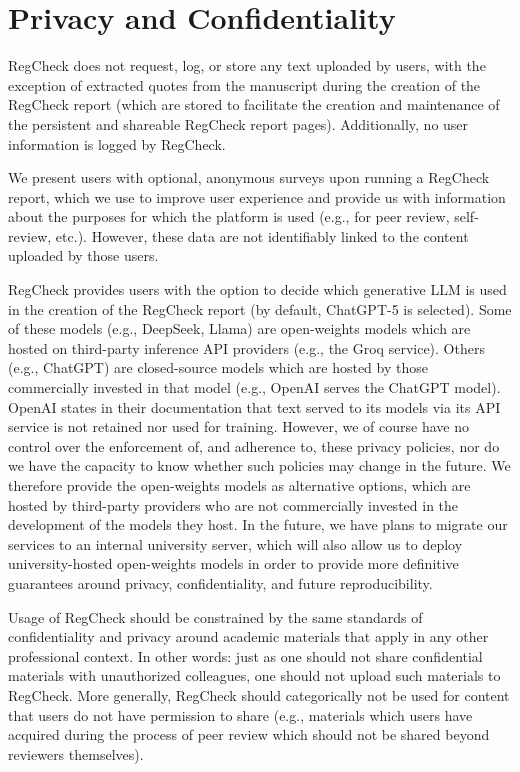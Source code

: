 \documentclass{article}
\begin{document}
\section{Privacy and Confidentiality}
RegCheck does not request, log, or store any text uploaded by users, with the exception of extracted quotes from the manuscript during the creation of the RegCheck report (which are stored to facilitate the creation and maintenance of the persistent and shareable RegCheck report pages). Additionally, no user information is logged by RegCheck.

We present users with optional, anonymous surveys upon running a RegCheck report, which we use to improve user experience and provide us with information about the purposes for which the platform is used (e.g., for peer review, self-review, etc.). However, these data are not identifiably linked to the content uploaded by those users.

RegCheck provides users with the option to decide which generative LLM is used in the creation of the RegCheck report (by default, ChatGPT-5 is selected). Some of these models (e.g., DeepSeek, Llama) are open-weights models which are hosted on third-party inference API providers (e.g., the Groq service). Others (e.g., ChatGPT) are closed-source models which are hosted by those commercially invested in that model (e.g., OpenAI serves the ChatGPT model). OpenAI states in their documentation that text served to its models via its API service is not retained nor used for training. However, we of course have no control over the enforcement of, and adherence to, these privacy policies, nor do we have the capacity to know whether such policies may change in the future. We therefore provide the open-weights models as alternative options, which are hosted by third-party providers who are not commercially invested in the development of the models they host. In the future, we have plans to migrate our services to an internal university server, which will also allow us to deploy university-hosted open-weights models in order to provide more definitive guarantees around privacy, confidentiality, and future reproducibility.

Usage of RegCheck should be constrained by the same standards of confidentiality and privacy around academic materials that apply in any other professional context. In other words: just as one should not share confidential materials with unauthorized colleagues, one should not upload such materials to RegCheck. More generally, RegCheck should categorically not be used for content that users do not have permission to share (e.g., materials which users have acquired during the process of peer review which should not be shared beyond reviewers themselves).
\end{document}
